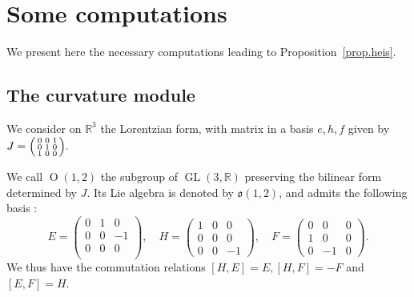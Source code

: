 \documentclass[11pt]{article}
\theoremstyle{definition}
\numberwithin{equation}{section}
\numberwithin{figure}{section}
\numberwithin{table}{section}
\DeclareMathOperator{\GL}{GL}
\newcommand*\RR{\mathbb{R}}
\newcommand{\oo}{{\mathfrak{o}}}
\newenvironment{smallpmatrix}{\left(\begin{smallmatrix}}{\end{smallmatrix}\right)}
\begin{document}
\appendix

\section{Some computations}\label{AnexA}
We present here the necessary computations leading to Proposition~\ref{prop.heis}.


\subsection{The curvature module}
We consider on $\RR^3$ the Lorentzian form, with matrix in a basis $e,h,f$ given by $ J=
\begin{smallpmatrix} 0&0&1\\ 0&1&0 \\ 1&0&0\\
\end{smallpmatrix}.$

We call ${\operatorname O}(1,2)$ the subgroup of $\GL(3,\RR)$ preserving the bilinear form determined by $J$. Its Lie algebra is denoted by $\oo(1,2)$, and admits the following basis :
\[
E=
\begin{pmatrix} 0&1&0\\ 0&0& -1\\ 0&0&0\\
\end{pmatrix},\quad
H=
\begin{pmatrix} 1&0&0\\ 0&0&0 \\ 0& 0& -1
\end{pmatrix},\quad
F=
\begin{pmatrix} 0&0&0\\ 1&0&0 \\ 0&-1& 0
\end{pmatrix}.
\]
We thus have the commutation relations $[H,E]=E, [H,F]=-F$ and $[E,F]=H$.
\end{document}
